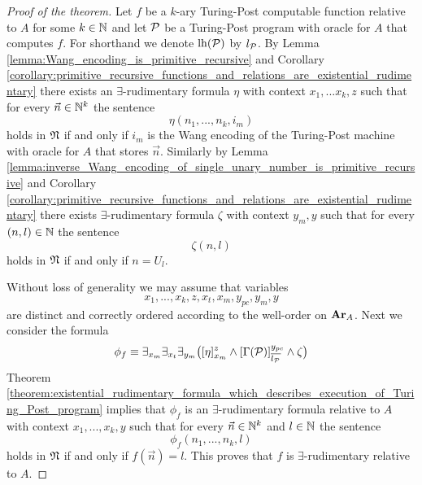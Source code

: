 \documentclass[10pt]{amsart}
\begin{document}
\begin{proof}[Proof of the theorem]
	Let $f$ be a $k$-ary Turing-Post computable function relative to $A$ for some $k \in {\mathbb N}$ and let ${\mathcal P}$ be a Turing-Post program with oracle for $A$ that computes $f$. For shorthand we denote $\mathrm{lh}({\mathcal P})$ by $l_{{\mathcal P}}$. By Lemma \ref{lemma:Wang_encoding_is_primitive_recursive} and Corollary \ref{corollary:primitive_recursive_functions_and_relations_are_existential_rudimentary} there exists an $\exists$-rudimentary formula $\eta$ with context $x_1,...x_k,z$ such that for every $\vec{n} \in {\mathbb N}^k$ the sentence
	$$\eta(n_1,...,n_k,i_m)$$
	holds in ${\mathfrak N}$ if and only if $i_m$ is the Wang encoding of the Turing-Post machine with oracle for $A$ that stores $\vec{n}$. Similarly by Lemma \ref{lemma:inverse_Wang_encoding_of_single_unary_number_is_primitive_recursive} and Corollary \ref{corollary:primitive_recursive_functions_and_relations_are_existential_rudimentary} there exists $\exists$-rudimentary formula $\zeta$ with context $y_m,y$ such that for every $(n,l) \in {\mathbb N}$ the sentence
	$$\zeta(n,l)$$
	holds in ${\mathfrak N}$ if and only if $n = U_l$.

	Without loss of generality we may assume that variables
	$$x_1,...,x_k,z,x_t,x_m,y_{pc},y_m,y$$
	are distinct and correctly ordered according to the well-order on $\mathbf{Ar}_A$. Next we consider the formula
	$$\phi_f \equiv \exists_{x_m}\exists_{x_t}\exists_{y_m}\big([\eta]^z_{x_m} \wedge [\Gamma({\mathcal P})]^{y_{pc}}_{\overline{l_{{\mathcal P}}}}\wedge \zeta\big)$$
	Theorem \ref{theorem:existential_rudimentary_formula_which_describes_execution_of_Turing_Post_program} implies that $\phi_f$ is an $\exists$-rudimentary formula relative to $A$ with context $x_1,...,x_k,y$ such that for every $\vec{n} \in {\mathbb N}^k$ and $l\in {\mathbb N}$ the sentence
	$$\phi_f(n_1,...,n_k,l)$$
	holds in ${\mathfrak N}$ if and only if $f(\vec{n}) = l$.	This proves that $f$ is $\exists$-rudimentary relative to $A$.
\end{proof}
\end{document}
